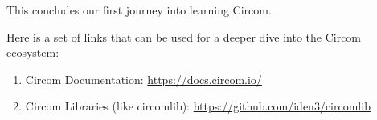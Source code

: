 \documentclass[../lecture-notes.tex]{subfiles}
\begin{document}
    This concludes our first journey into learning Circom.

    \begin{remark}
        Here is a set of links that can be used for a deeper dive into the Circom ecosystem:
        \begin{enumerate}
            \item Circom Documentation: \url{https://docs.circom.io/}
            \item Circom Libraries (like circomlib): \url{https://github.com/iden3/circomlib}
        \end{enumerate}
    \end{remark}
\end{document}
